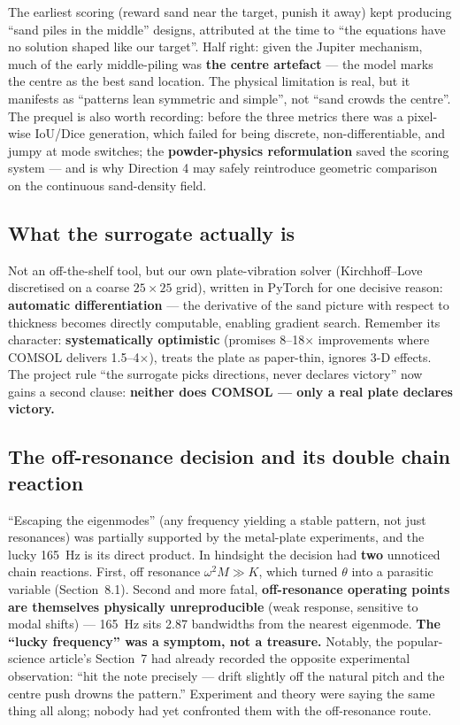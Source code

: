 \documentclass[11pt,a4paper]{article}
\begin{document}
The earliest scoring (reward sand near the target, punish it away) kept producing ``sand piles in the middle'' designs, attributed at the time to ``the equations have no solution shaped like our target''. Half right: given the Jupiter mechanism, much of the early middle-piling was \textbf{the centre artefact} --- the model marks the centre as the best sand location. The physical limitation is real, but it manifests as ``patterns lean symmetric and simple'', not ``sand crowds the centre''. The prequel is also worth recording: before the three metrics there was a pixel-wise IoU/Dice generation, which failed for being discrete, non-differentiable, and jumpy at mode switches; the \textbf{powder-physics reformulation} saved the scoring system --- and is why Direction 4 may safely reintroduce geometric comparison on the continuous sand-density field.

\subsection{What the surrogate actually is}

Not an off-the-shelf tool, but our own plate-vibration solver (Kirchhoff--Love discretised on a coarse $25\times 25$ grid), written in PyTorch for one decisive reason: \textbf{automatic differentiation} --- the derivative of the sand picture with respect to thickness becomes directly computable, enabling gradient search. Remember its character: \textbf{systematically optimistic} (promises 8--18$\times$ improvements where COMSOL delivers 1.5--4$\times$), treats the plate as paper-thin, ignores 3-D effects. The project rule ``the surrogate picks directions, never declares victory'' now gains a second clause: \textbf{neither does COMSOL --- only a real plate declares victory.}

\subsection{The off-resonance decision and its double chain reaction}

``Escaping the eigenmodes'' (any frequency yielding a stable pattern, not just resonances) was partially supported by the metal-plate experiments, and the lucky 165~Hz is its direct product. In hindsight the decision had \textbf{two} unnoticed chain reactions. First, off resonance $\omega^2 M \gg K$, which turned $\theta$ into a parasitic variable (Section~8.1). Second and more fatal, \textbf{off-resonance operating points are themselves physically unreproducible} (weak response, sensitive to modal shifts) --- 165~Hz sits 2.87 bandwidths from the nearest eigenmode. \textbf{The ``lucky frequency'' was a symptom, not a treasure.} Notably, the popular-science article's Section~7 had already recorded the opposite experimental observation: ``hit the note precisely --- drift slightly off the natural pitch and the centre push drowns the pattern.'' Experiment and theory were saying the same thing all along; nobody had yet confronted them with the off-resonance route.
\end{document}
